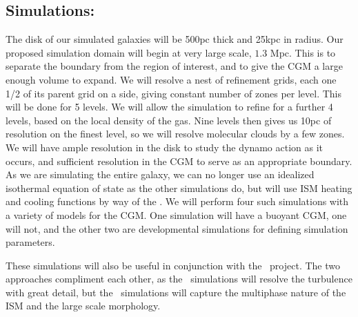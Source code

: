 \subsection{Simulations: \nameGalaxies}
\label{subsec.galaxies_sims}

The disk of our simulated galaxies will be 500pc thick and 25kpc in radius.  Our
proposed simulation domain will begin at very large scale, $1.3$ Mpc.  This is to
separate the boundary from the region of interest, and to give the CGM a large
enough volume to expand.  We will resolve a nest of refinement grids, each one
1/2 of its parent grid on a side, giving constant number of zones per level.
This will be done for 5 levels.  We will allow the simulation to 
refine for a further 4 levels, based on the local density of the gas.  Nine
levels then gives us 10pc of resolution on the finest
level, so we will resolve molecular clouds by a few zones.  We will have ample
resolution in the disk to study the dynamo action as it occurs, and sufficient
resolution in the CGM to serve as an appropriate boundary.  As we are simulating
the entire galaxy, we can no longer use an idealized isothermal equation of
state as the other simulations do, but will use ISM heating and cooling functions by way of the
.  We will perform four such simulations with a variety of models
for the CGM.  One simulation will have a buoyant CGM, one will not, and the
other two are developmental simulations for defining simulation parameters.

These simulations will also be useful in conjunction with the \nameCMB\ project.
The two approaches compliment each other, as the \nameCMB\ simulations will
resolve the turbulence with great detail, but the \nameGalaxies\ simulations
will capture the multiphase nature of the ISM and the large scale morphology.
